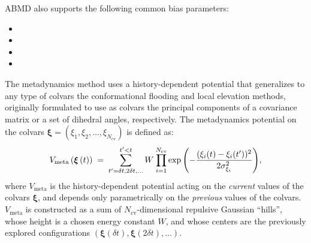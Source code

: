 ABMD also supports the following common bias parameters:
\begin{itemize}
  \item {}
  \item {}
  \item {}
  \item {}
\end{itemize}




The metadynamics method uses a history-dependent potential \cite{Laio2002} that generalizes to any type of colvars the conformational flooding \cite{Grubmuller1995} and local elevation \cite{Huber1994} methods,  originally formulated to use as colvars the principal components of a covariance matrix or a set of dihedral  angles, respectively.
The metadynamics potential on the colvars $\bm{\xi} = (\xi_{1}, \xi_{2}, \ldots, \xi_{N_{\mathrm{cv}}})$ is defined as:
\begin{equation}
  \label{eq:colvars_meta_pot}
  V_{\mathrm{meta}}\left({\mbox{\boldmath{$\xi$}}}\left(t\right)\right) \; = \; {
    \sum_{t' = \delta{}t, \\ 2\delta{}t, \\ \ldots}^{t'<t} W \: {
      \prod_{i = 1}^{N_{\mathrm{cv}}}
      \exp\left(-\frac{(\xi_{i}(t)-\xi_{i}(t'))^{2}}{2\sigma_{\xi_{i}}^{2}}\right)
    }
  }\mathrm{,}
\end{equation}
where $V_{\mathrm{meta}}$ is the history-dependent potential acting on the \emph{current} values of the colvars $\bm{\xi}$, and depends only parametrically on the \emph{previous} values of the colvars.
$V_{\mathrm{meta}}$ is constructed as a sum of $N_{\mathrm{cv}}$-dimensional repulsive Gaussian ``hills'', whose height is a chosen energy constant $W$, and whose centers are the previously explored configurations $\left(\bm{\xi}(\delta{}t), \bm{\xi}(2\delta{}t), \ldots\right)$.

